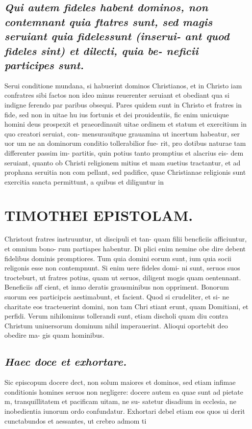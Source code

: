 \documentclass{article}
\begin{document}
\begin{pages}
\subsection*{\textit{Qui autem fideles habent dominos, non contemnant quia ftatres sunt, sed magis seruiant quia fidelessunt (inserui- ant quod fideles sint) et dilecti, quia be- neficii participes sunt. }}\pstart Serui conditione mundana, si habuerint dominos Christianos, et in Christo iam confratres sibi factos non ideo minus reuerenter seruiant et obediant qua si indigne ferendo par paribus obsequi. Pares quidem sunt in Christo et fratres in fide, sed non in uitae hu ius fortunis et dei prouidentiis, fic enim unicuique  homini deus prospexit et praeordinauit uitae ordinem et statum et exercitium in quo creatori seruiat, con- mensurauitque grauamina ut incertum habeatur, ser uor um ne an dominorum conditio tollerabilior fue- rit, pro dotibus naturae tam differenter passim im- partitis, quin potius tanto promptius et alacrius eis- dem seruiant, quanto ob Christi religionem mitius et mam suetius tractantur, et ad prophana seruitia non com pellant, sed padifice, quae Christianae religionis sunt exercitia sancta permittunt, a quibus et diliguntur in  \pend
\section*{TIMOTHEI EPISTOLAM. }
\marginpar{[ p.155 ]}\pstart Christout fratres instruuntur, ut discipuli et tan- quam filii bencficiis afficiuntur, et omnium bono- rum partiapes habentur. Di plici enim nemine obe dire debent fidelibus dominis promptiores. Tum quia domini eorum sunt, ium quia socii religonis esse non contempnunt. Si enim uere fideles domi- ni sunt, seruos suos trocteburt, ut fratres potius, quam ut seruos, diligent mogis quam oentennant. Beneficiis aff cient, et inmo deratis grausminibus non oppriment. Bonorum suorum ees participcis aestimabunt, et facient. Quod si crudeliter, et si- ne charitate eos tracteuerint domini, non tam Chri stiant erunt, quam Domitiani, et perfidi. Verum nihilominus tollerandi sunt, etiam discholi quam diu contra Christum uniuersorum dominum nihil imperauerint. Alioqui oportebit deo obedire ma- gis quam hominibus.  \pend
{}
{}
\subsection*{\textit{Haec doce et exhortare. }}\pstart Sic episcopum docere dect, non solum maiores et dominos, sed etiam infimae conditionis homines seruos non negligere: docere autem ea quae sunt ad pietate m, tranquillitatem et pacificam uitam, ne su- satetur disadium in ecclesia, ne inobedientia iunorum ordo confundatur. Exhortari debel etiam eos quos ui derit cunctabundos et aessantes, ut crebro admom ti  \pend

\end{pages}
\end{document}
